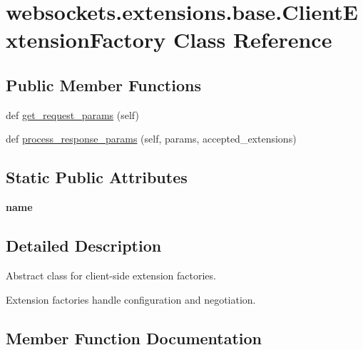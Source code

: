 \hypertarget{classwebsockets_1_1extensions_1_1base_1_1_client_extension_factory}{}\section{websockets.\+extensions.\+base.\+Client\+Extension\+Factory Class Reference}
\label{classwebsockets_1_1extensions_1_1base_1_1_client_extension_factory}
\subsection*{Public Member Functions}
\begin{DoxyCompactItemize}
\item 
def \hyperlink{classwebsockets_1_1extensions_1_1base_1_1_client_extension_factory_a09b84860d0bd35f6c634e96d17432fb1}{get\+\_\+request\+\_\+params} (self)
\item 
def \hyperlink{classwebsockets_1_1extensions_1_1base_1_1_client_extension_factory_a8ded17af12365d1b4f2c44fd6e0e257c}{process\+\_\+response\+\_\+params} (self, params, accepted\+\_\+extensions)
\end{DoxyCompactItemize}
\subsection*{Static Public Attributes}
\begin{DoxyCompactItemize}
\item 
\mbox{\label{classwebsockets_1_1extensions_1_1base_1_1_client_extension_factory_a23a536b8ae84d7e630f00a71ba6e1496}} 
{\bfseries name}
\end{DoxyCompactItemize}


\subsection{Detailed Description}
\begin{DoxyVerb}Abstract class for client-side extension factories.

Extension factories handle configuration and negotiation.\end{DoxyVerb}
 

\subsection{Member Function Documentation}
\mbox{\label{classwebsockets_1_1extensions_1_1base_1_1_client_extension_factory_a09b84860d0bd35f6c634e96d17432fb1}} 
